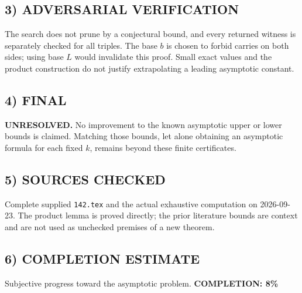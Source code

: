\subsection*{3) ADVERSARIAL VERIFICATION}
The search does not prune by a conjectural bound, and every returned witness is separately checked for all triples. The base $b$ is chosen to forbid carries on both sides; using base $L$ would invalidate this proof. Small exact values and the product construction do not justify extrapolating a leading asymptotic constant.
\subsection*{4) FINAL}
\textbf{UNRESOLVED.} No improvement to the known asymptotic upper or lower bounds is claimed. Matching those bounds, let alone obtaining an asymptotic formula for each fixed $k$, remains beyond these finite certificates.
\subsection*{5) SOURCES CHECKED}
Complete supplied \texttt{142.tex} and the actual exhaustive computation on 2026-09-23. The product lemma is proved directly; the prior literature bounds are context and are not used as unchecked premises of a new theorem.
\subsection*{6) COMPLETION ESTIMATE}
Subjective progress toward the asymptotic problem.
\textbf{COMPLETION: 8\%}
